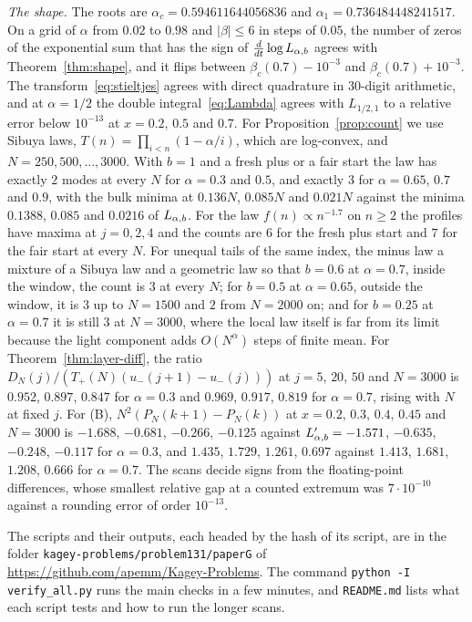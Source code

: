 \emph{The shape.} The roots are $\alpha_c=0.594611644056836$ and
$\alpha_1=0.736484448241517$. On a grid of $\alpha$ from $0.02$ to $0.98$ and $|\beta|\le6$ in
steps of $0.05$, the number of zeros of the exponential sum that has the sign of
$\frac d{dt}\log L_{\alpha,b}$ agrees with Theorem~\ref{thm:shape}, and it flips between
$\beta_c(0.7)-10^{-3}$ and $\beta_c(0.7)+10^{-3}$. The transform~\eqref{eq:stieltjes} agrees with
direct quadrature in $30$-digit arithmetic, and at $\alpha=1/2$ the double
integral~\eqref{eq:Lambda} agrees with $L_{1/2,1}$ to a relative error below $10^{-13}$ at
$x=0.2$, $0.5$ and $0.7$. For Proposition~\ref{prop:count} we use Sibuya laws,
$T(n)=\prod_{i<n}(1-\alpha/i)$, which are log-convex, and $N=250,500,\dots,3000$. With $b=1$ and
a fresh plus or a fair start the law has exactly $2$ modes at every $N$ for $\alpha=0.3$ and
$0.5$, and exactly $3$ for $\alpha=0.65$, $0.7$ and $0.9$, with the bulk minima at $0.136N$,
$0.085N$ and $0.021N$ against the minima $0.1388$, $0.085$ and $0.0216$ of $L_{\alpha,b}$. For the law
$f(n)\propto n^{-1.7}$ on $n\ge2$ the profiles have maxima at $j=0,2,4$ and the counts are $6$
for the fresh plus start and $7$ for the fair start at every $N$. For unequal tails of the
same index, the minus law a mixture of a Sibuya law and a geometric law so that $b=0.6$ at
$\alpha=0.7$, inside the window, the count is $3$ at every $N$; for $b=0.5$ at $\alpha=0.65$,
outside the window, it is $3$ up to $N=1500$ and $2$ from $N=2000$ on; and for $b=0.25$ at
$\alpha=0.7$ it is still $3$ at $N=3000$, where the local law itself is far from its limit
because the light component adds $O(N^\alpha)$ steps of finite mean. For Theorem~\ref{thm:layer-diff}, the ratio
$D_N(j)/(T_\plus(N)(u_\minus(j+1)-u_\minus(j)))$ at $j=5$, $20$, $50$ and $N=3000$ is $0.952$,
$0.897$, $0.847$ for $\alpha=0.3$ and $0.969$, $0.917$, $0.819$ for $\alpha=0.7$, rising with $N$ at
fixed $j$. For (B), $N^2(P_N(k+1)-P_N(k))$ at $x=0.2$, $0.3$, $0.4$, $0.45$ and $N=3000$ is
$-1.688$, $-0.681$, $-0.266$, $-0.125$ against $L_{\alpha,b}'=-1.571$, $-0.635$, $-0.248$, $-0.117$ for
$\alpha=0.3$, and $1.435$, $1.729$, $1.261$, $0.697$ against $1.413$, $1.681$, $1.208$, $0.666$
for $\alpha=0.7$. The scans decide signs from the floating-point differences, whose smallest
relative gap at a counted extremum was $7\cdot10^{-10}$ against a rounding error of order
$10^{-13}$.

The scripts and their outputs, each headed by the hash of its script, are in the folder
\nolinkurl{kagey-problems/problem131/paperG} of \url{https://github.com/apemm/Kagey-Problems}.
The command \texttt{python -I verify\_all.py} runs the main checks in a few minutes, and
\nolinkurl{README.md} lists what each script tests and how to run the longer scans.
